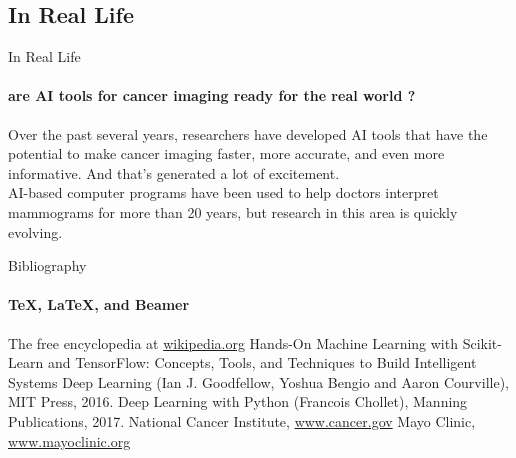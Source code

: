 \documentclass{beamer}
\begin{document}
    \subsection{In Real Life}
    \begin{frame}{In Real Life}
      \framesubtitle{are AI tools for cancer imaging ready for the real world ?}
      Over the past several years, researchers have developed AI tools that have the potential to make cancer imaging faster, more accurate, and even more informative. And that’s generated a lot of excitement. \\
      AI-based computer programs have been used to help doctors interpret mammograms for more than 20 years, but research in this area is quickly evolving. \\
    \end{frame}

\begin{frame}[label=bibliography]{Bibliography}
  \framesubtitle{\TeX, \LaTeX, and Beamer}
  \begin{thebibliography}{9}
    The free encyclopedia at
    \href{https://wikipedia.org}{wikipedia.org}
    Hands-On Machine Learning with Scikit-Learn and TensorFlow: Concepts, Tools, and Techniques to Build Intelligent Systems
    Deep Learning (Ian J. Goodfellow, Yoshua Bengio and Aaron Courville), MIT Press, 2016.
    Deep Learning with Python (Francois Chollet), Manning Publications, 2017.
    National Cancer Institute, \href{https://www.cancer.gov}{www.cancer.gov}
    Mayo Clinic, \href{https://www.mayoclinic.org}{www.mayoclinic.org}
  \end{thebibliography}
\end{frame}

\end{document}
